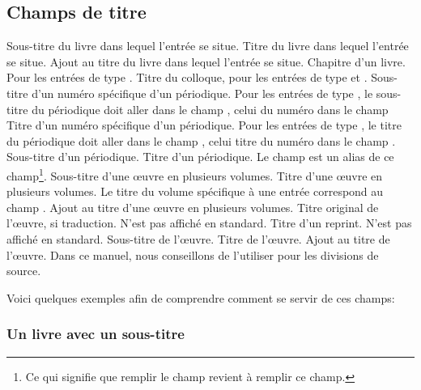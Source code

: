 \subsection{Champs de titre}


\begin{fieldlist}
	Sous-titre du livre dans lequel l'entrée se situe. 
   	 Titre du livre dans lequel l'entrée se situe. 		
   	 Ajout au titre du livre dans lequel l'entrée se situe. 
   	 Chapitre d'un livre. Pour les entrées de type .	
   	 Titre du colloque, pour les entrées de type  et .
   	 Sous-titre d'un numéro spécifique d'un périodique. 	Pour les entrées de type , le sous-titre du périodique doit aller dans le champ , celui du numéro dans le champ 		
   	 Titre d'un numéro spécifique d'un périodique. Pour les entrées de type , le titre du périodique doit aller dans le champ , celui titre du numéro dans le champ .		
   	 Sous-titre d'un périodique.							
   	 Titre d'un périodique. Le champ  est un alias de ce champ\footnote{Ce qui signifie que remplir le champ  revient à remplir ce champ.}.				
   	 Sous-titre d'une œuvre en plusieurs volumes.			
   	 Titre d'une œuvre en plusieurs volumes. Le titre du volume spécifique à une entrée correspond au champ .						
   	  Ajout au titre d'une œuvre en plusieurs volumes.		
   	 Titre original de l'œuvre, si traduction. N'est pas affiché en standard. 
   	 Titre d'un reprint. N'est pas affiché en standard.	
   	 Sous-titre de l'œuvre.									
   	 Titre de l'œuvre.									
   	 Ajout au titre de l'œuvre. Dans ce manuel, nous conseillons de l'utiliser pour les divisions de source.
\end{fieldlist}

Voici quelques exemples afin de comprendre comment se servir de ces champs:

\subsubsection{Un livre avec un sous-titre}

